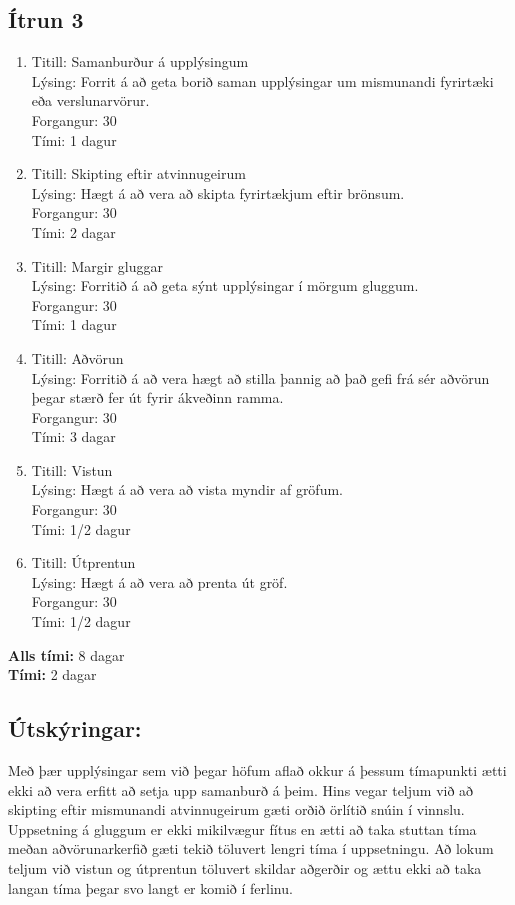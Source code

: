 \documentclass[a4,12pt]{article}
\begin{document}
\subsection{Ítrun 3}
\begin{enumerate}[]
\item Titill: Samanburður á upplýsingum\\
Lýsing: Forrit á að geta borið saman upplýsingar um mismunandi fyrirtæki eða verslunarvörur.\\
Forgangur: 30\\
Tími: 1 dagur

\item Titill: Skipting eftir atvinnugeirum\\
Lýsing: Hægt á að vera að skipta fyrirtækjum eftir brönsum.\\
Forgangur: 30\\
Tími: 2 dagar

\item Titill: Margir gluggar\\
Lýsing: Forritið á að geta sýnt upplýsingar í mörgum gluggum.\\
Forgangur: 30\\
Tími: 1 dagur

\item Titill: Aðvörun\\
Lýsing: Forritið á að vera hægt að stilla þannig að það gefi frá sér aðvörun þegar stærð fer út fyrir ákveðinn ramma.\\
Forgangur: 30\\
Tími: 3 dagar

\item Titill: Vistun\\
Lýsing: Hægt á að vera að vista myndir af gröfum.\\
Forgangur: 30\\
Tími: 1/2 dagur

\item Titill: Útprentun\\
Lýsing: Hægt á að vera að prenta út gröf.\\
Forgangur: 30\\
Tími: 1/2 dagur

\end{enumerate}
\textbf{Alls tími:} 8 dagar\\
\textbf{Tími:} 2 dagar\\

\subsection{Útskýringar:} Með þær upplýsingar sem við þegar höfum aflað okkur á þessum tímapunkti ætti ekki að vera erfitt að setja upp samanburð á þeim. Hins vegar teljum við að skipting eftir mismunandi atvinnugeirum gæti orðið örlítið snúin í vinnslu. Uppsetning á gluggum er ekki mikilvægur fítus en ætti að taka stuttan tíma meðan aðvörunarkerfið gæti tekið töluvert lengri tíma í uppsetningu. Að lokum teljum við vistun og útprentun töluvert skildar aðgerðir og ættu ekki að taka langan tíma þegar svo langt er komið í ferlinu.
\end{document}

